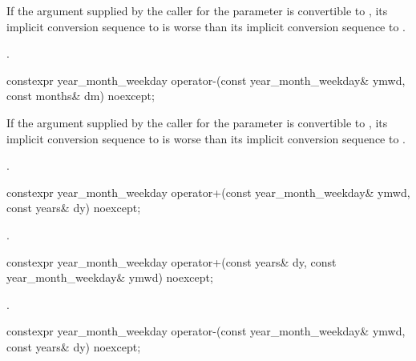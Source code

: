 \begin{itemdescr}
\pnum
\constraints
If the argument supplied by the caller for the  parameter
is convertible to ,
its implicit conversion sequence to 
is worse than its implicit conversion sequence to
.

\pnum
\returns
{}.
\end{itemdescr}

%
\begin{itemdecl}
constexpr year_month_weekday operator-(const year_month_weekday& ymwd, const months& dm) noexcept;
\end{itemdecl}

\begin{itemdescr}
\pnum
\constraints
If the argument supplied by the caller for the  parameter
is convertible to ,
its implicit conversion sequence to 
is worse than its implicit conversion sequence to
.

\pnum
\returns
{}.
\end{itemdescr}

%
\begin{itemdecl}
constexpr year_month_weekday operator+(const year_month_weekday& ymwd, const years& dy) noexcept;
\end{itemdecl}

\begin{itemdescr}
\pnum
\returns
{}.
\end{itemdescr}

%
\begin{itemdecl}
constexpr year_month_weekday operator+(const years& dy, const year_month_weekday& ymwd) noexcept;
\end{itemdecl}

\begin{itemdescr}
\pnum
\returns
{}.
\end{itemdescr}

%
\begin{itemdecl}
constexpr year_month_weekday operator-(const year_month_weekday& ymwd, const years& dy) noexcept;
\end{itemdecl}

